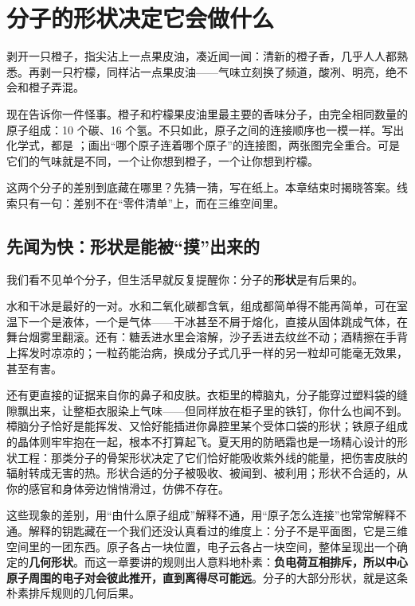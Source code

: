 \chapter{分子的形状决定它会做什么}

\begin{kaichang}
剥开一只橙子，指尖沾上一点果皮油，凑近闻一闻：清新的橙子香，几乎人人都熟悉。再剥一只柠檬，同样沾一点果皮油——气味立刻换了频道，酸冽、明亮，绝不会和橙子弄混。

现在告诉你一件怪事。橙子和柠檬果皮油里最主要的香味分子，由完全相同数量的原子组成：10 个碳、16 个氢。不只如此，原子之间的连接顺序也一模一样。写出化学式，都是 ；画出“哪个原子连着哪个原子”的连接图，两张图完全重合。可是它们的气味就是不同，一个让你想到橙子，一个让你想到柠檬。

这两个分子的差别到底藏在哪里？先猜一猜，写在纸上。本章结束时揭晓答案。线索只有一句：差别不在“零件清单”上，而在三维空间里。
\end{kaichang}

\section{先闻为快：形状是能被“摸”出来的}

我们看不见单个分子，但生活早就反复提醒你：分子的\textbf{形状}是有后果的。

水和干冰是最好的一对。水和二氧化碳都含氧，组成都简单得不能再简单，可在室温下一个是液体，一个是气体——干冰甚至不屑于熔化，直接从固体跳成气体，在舞台烟雾里翻滚。还有：糖丢进水里会溶解，沙子丢进去纹丝不动；酒精擦在手背上挥发时凉凉的；一粒药能治病，换成分子式几乎一样的另一粒却可能毫无效果，甚至有害。

还有更直接的证据来自你的鼻子和皮肤。衣柜里的樟脑丸，分子能穿过塑料袋的缝隙飘出来，让整柜衣服染上气味——但同样放在柜子里的铁钉，你什么也闻不到。樟脑分子恰好是能挥发、又恰好能插进你鼻腔里某个受体口袋的形状；铁原子组成的晶体则牢牢抱在一起，根本不打算起飞。夏天用的防晒霜也是一场精心设计的形状工程：那类分子的骨架形状决定了它们恰好能吸收紫外线的能量，把伤害皮肤的辐射转成无害的热。形状合适的分子被吸收、被闻到、被利用；形状不合适的，从你的感官和身体旁边悄悄滑过，仿佛不存在。

这些现象的差别，用“由什么原子组成”解释不通，用“原子怎么连接”也常常解释不通。解释的钥匙藏在一个我们还没认真看过的维度上：分子不是平面图，它是三维空间里的一团东西。原子各占一块位置，电子云各占一块空间，整体呈现出一个确定的\textbf{几何形状}。而这一章要讲的规则出人意料地朴素：\textbf{负电荷互相排斥，所以中心原子周围的电子对会彼此推开，直到离得尽可能远}。分子的大部分形状，就是这条朴素排斥规则的几何后果。

